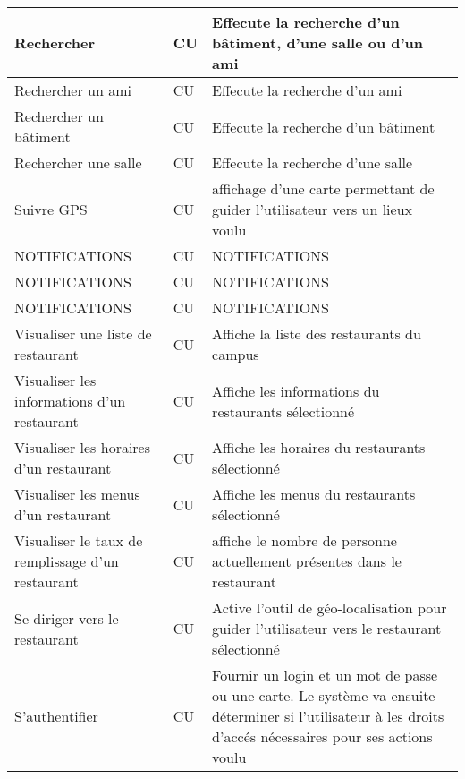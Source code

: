 \begin{center}
\begin{longtable}[c]{|p{100pt}| p{50pt}| p{250pt}|}
	Rechercher	&	CU	& Effecute la recherche d'un bâtiment, d'une salle ou d'un ami\\ \hline
	
	Rechercher un ami	&	CU	& Effecute la recherche d'un ami\\ \hline
	
	Rechercher un bâtiment	&	CU	& Effecute la recherche d'un bâtiment\\ \hline
	
	Rechercher une salle	&	CU	& Effecute la recherche d'une salle\\ \hline
	
	Suivre GPS	&	CU	& affichage d'une carte permettant de guider l'utilisateur vers un lieux voulu\\ \hline
	
	NOTIFICATIONS 	&	CU	& NOTIFICATIONS\\ \hline
	
	NOTIFICATIONS 	&	CU	& NOTIFICATIONS\\ \hline
	
	NOTIFICATIONS 	&	CU	& NOTIFICATIONS\\ \hline
	
	Visualiser une liste de restaurant 	&	CU	& Affiche la liste des restaurants du campus \\\hline
	
	Visualiser les informations d'un restaurant 	&	CU	& Affiche les informations du restaurants sélectionné \\\hline
	
	Visualiser les horaires d'un restaurant 	&	CU	& Affiche les horaires du restaurants sélectionné \\\hline
	
	Visualiser les menus d'un restaurant 	&	CU	& Affiche les menus du restaurants sélectionné \\\hline
	
	Visualiser le taux de remplissage d'un restaurant 	&	CU	&  affiche le nombre de personne actuellement présentes dans le restaurant \\\hline
	
	Se diriger vers le restaurant 	&	CU	& Active l'outil de géo-localisation pour guider l'utilisateur vers le restaurant sélectionné \\\hline
	
	S'authentifier 	&	CU	& Fournir un login et un mot de passe ou une carte. Le système va ensuite déterminer si l'utilisateur à les droits d'accés nécessaires pour ses actions voulu \\\hline
	

\end{longtable}
\end{center}
